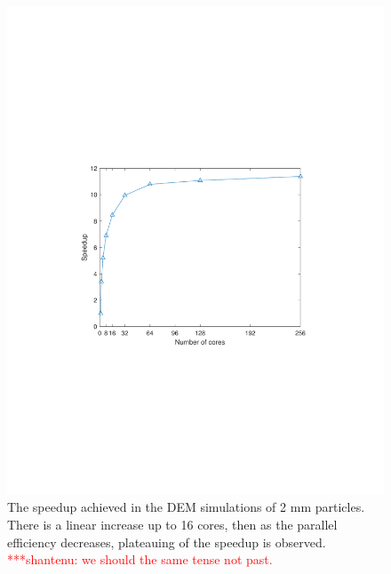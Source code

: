 \documentclass[preprint,11pt,authoryear]{elsarticle}
\newcommand{\jhanote}[1]{ {\textcolor{red} { ***shantenu: #1 }}}
\newcommand{\jhanote}[1]{}
\begin{document}
\begin{figure}
\centering
\includegraphics[scale=0.75]{rslsts_2mm_DEM_speedup_mtlb.pdf}
\caption{The speedup achieved in the DEM simulations of 2 mm particles. There 
is a linear increase up to 16 cores, then as the parallel 
efficiency decreases, plateauing of the speedup is observed. \jhanote{we should the same tense not past. }}
\label{fig:rslts_DEM_speedup}
\end{figure}
\end{document}
